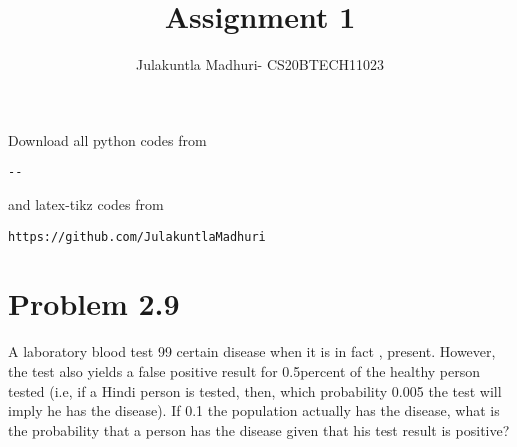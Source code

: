 \documentclass[journal,12pt,twocolumn]{IEEEtran}
\begin{document}
\title{Assignment 1}
\author{Julakuntla Madhuri- CS20BTECH11023}
\maketitle
\newpage
\bigskip
\renewcommand{\thefigure}{\theenumi}
\renewcommand{\thetable}{\theenumi}
Download all python codes from 
\begin{lstlisting}
--
\end{lstlisting}
%
and latex-tikz codes from 
%
\begin{lstlisting}
https://github.com/JulakuntlaMadhuri\end{lstlisting}
\section{Problem 2.9}
A laboratory blood test 
99%
certain disease when it is 
in fact , present. However,
the test also yields a false
positive result for 
0.5percent
of the healthy person tested
(i.e, if a Hindi person is tested, 
then, which probability 0.005 
the test will imply he has 
the disease). If 0.1%
the population actually has 
the disease, what is the
probability that a person
has the disease given that 
his test result is positive?
\end{document}

